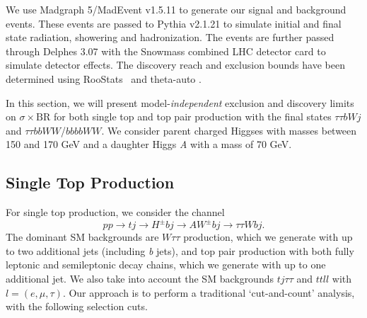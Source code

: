 We use Madgraph 5/MadEvent v1.5.11 \cite{Alwall:2014hca} to generate our signal and background events. These events are passed to Pythia v2.1.21 \cite{Sjostrand:2006za} to simulate initial and final state radiation, showering and hadronization. The events are further passed through Delphes 3.07 \cite{deFavereau:2013fsa} with the Snowmass combined LHC detector card \cite{Anderson:2013kxz} to simulate detector effects. The discovery reach and exclusion bounds have been determined using RooStats~\cite{Moneta:2010pm} and theta-auto \cite{theta_auto}. 

In this section, we will present model-\emph{independent} exclusion and discovery limits on $\sigma\times\text{BR}$ for both single top and top pair production with the final states $\tau\tau bW j$ and $\tau\tau bbWW$/$bbbbWW$. We consider parent charged Higgses with masses between 150 and 170 GeV and a daughter Higgs \emph{A} with a mass of 70 GeV. 

\subsection{Single Top Production}\label{subsec:light_charged_analysis_tj}
 
For single top production, we consider the channel
\[pp\rightarrow tj\rightarrow H^{\pm} bj\rightarrow AW^{\pm}bj \rightarrow \tau\tau W bj.\]
The dominant SM backgrounds are $W\tau\tau$ production, which we generate with up to two additional jets (including \emph{b} jets), and top pair production with both fully leptonic and semileptonic decay chains, which we generate with up to one additional jet. We also take into account the SM backgrounds $tj\tau\tau$ and $ttll$ with $l= (e, \mu, \tau)$. Our approach is to perform a traditional `cut-and-count' analysis, with the following selection cuts.


